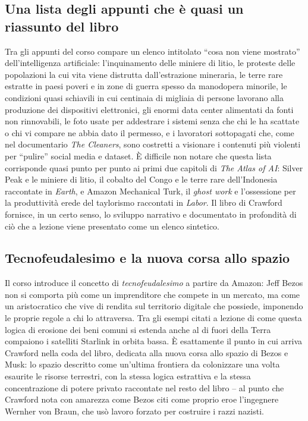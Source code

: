 \documentclass[a4paper,11pt]{article}
\begin{document}
\subsection{Una lista degli appunti che è quasi un riassunto del libro}

Tra gli appunti del corso compare un elenco intitolato ``cosa non viene mostrato'' dell'intelligenza artificiale: l'inquinamento delle miniere di litio, le proteste delle popolazioni la cui vita viene distrutta dall'estrazione mineraria, le terre rare estratte in paesi poveri e in zone di guerra spesso da manodopera minorile, le condizioni quasi schiavili in cui centinaia di migliaia di persone lavorano alla produzione dei dispositivi elettronici, gli enormi data center alimentati da fonti non rinnovabili, le foto usate per addestrare i sistemi senza che chi le ha scattate o chi vi compare ne abbia dato il permesso, e i lavoratori sottopagati che, come nel documentario \emph{The Cleaners}, sono costretti a visionare i contenuti più violenti per ``pulire'' social media e dataset. È difficile non notare che questa lista corrisponde quasi punto per punto ai primi due capitoli di \emph{The Atlas of AI}: Silver Peak e le miniere di litio, il cobalto del Congo e le terre rare dell'Indonesia raccontate in \emph{Earth}, e Amazon Mechanical Turk, il \emph{ghost work} e l'ossessione per la produttività erede del taylorismo raccontati in \emph{Labor}. Il libro di Crawford fornisce, in un certo senso, lo sviluppo narrativo e documentato in profondità di ciò che a lezione viene presentato come un elenco sintetico.

\subsection{Tecnofeudalesimo e la nuova corsa allo spazio}

Il corso introduce il concetto di \emph{tecnofeudalesimo} a partire da Amazon: Jeff Bezos non si comporta più come un imprenditore che compete in un mercato, ma come un aristocratico che vive di rendita sul territorio digitale che possiede, imponendo le proprie regole a chi lo attraversa. Tra gli esempi citati a lezione di come questa logica di erosione dei beni comuni si estenda anche al di fuori della Terra compaiono i satelliti Starlink in orbita bassa. È esattamente il punto in cui arriva Crawford nella coda del libro, dedicata alla nuova corsa allo spazio di Bezos e Musk: lo spazio descritto come un'ultima frontiera da colonizzare una volta esaurite le risorse terrestri, con la stessa logica estrattiva e la stessa concentrazione di potere privato raccontate nel resto del libro -- al punto che Crawford nota con amarezza come Bezos citi come proprio eroe l'ingegnere Wernher von Braun, che usò lavoro forzato per costruire i razzi nazisti.
\end{document}
